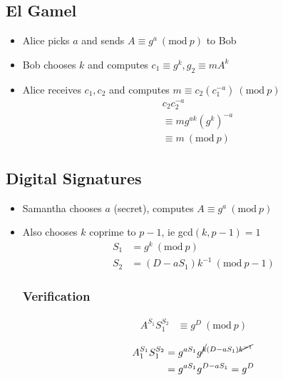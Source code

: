 \documentclass{article}
\newcommand{\Mod}[1]{\ (\mathrm{mod}\ #1)}
\begin{document}
\begin{multicols}{2}
    \section*{El Gamel}
    \begin{itemize}
        \item Alice picks \(a\) and sends \(A \equiv g^a \Mod{p}\) to Bob
        \item Bob chooses \(k\) and computes \(c_1 \equiv g^k, g_2 \equiv mA^k\)
        \item Alice receives \(c_1, c_2\) and computes \(m \equiv c_2(c_1^{-a}) \Mod{p}\)
              \begin{align*}
                   & c_2c_2^{-a}               \\
                   & \equiv mg^{ak} (g^k)^{-a} \\
                   & \equiv m \Mod{p}
              \end{align*}
    \end{itemize}

    \subsection*{Digital Signatures}
    \begin{itemize}
        \item Samantha chooses \(a\) (secret), computes \(A \equiv g^a \Mod{p}\)
        \item Also chooses \(k\) coprime to \(p-1\), ie gcd\((k, p-1) = 1\)
              \begin{align*}
                  S_1 & = g^k \Mod{p}                \\
                  S_2 & = (D - aS_1)k^{-1} \Mod{p-1}
              \end{align*}
              \subsubsection*{Verification}
              \begin{align*}
                  A^{S_1}S_1^{S_2} & \equiv g^D \Mod{p} \\
              \end{align*}
              \begin{align*}
                  A_1^{S_1}S_1^{S_2} & = g^{aS_1}g^{\cancel{k}(D-aS_1) \cancel{k^{-1}}} \\
                                     & = g^{aS_1}g^{D-aS_1} = g^D
              \end{align*}
    \end{itemize}
\end{multicols}
\end{document}
